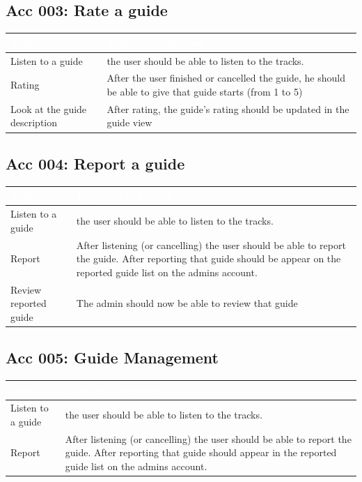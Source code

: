 \documentclass[12pt]{article}
\theoremstyle{definition}
\begin{document}
    \subsection{Acc 003: Rate a guide}
    \begin{tabular}{|p{.3\linewidth}|p{.7\linewidth}|}
        \hline
        \cellcolor[gray]{0.5}\textcolor{white}{Steps} & \cellcolor[gray]{0.5}\textcolor{white}{Expected behaviour} \\ \hline
        Listen to a guide & the user should be able to listen to the tracks. \\ \hline
        Rating & After the user finished or cancelled the guide, he should be able to give that guide starts (from 1 to 5) \\ \hline
        Look at the guide description & After rating, the guide's rating should be updated in the guide view \\ \hline
    \end{tabular}
    
    \subsection{Acc 004: Report a guide}
    \begin{tabular}{|p{.3\linewidth}|p{.7\linewidth}|}
        \hline
        \cellcolor[gray]{0.5}\textcolor{white}{Steps} & \cellcolor[gray]{0.5}\textcolor{white}{Expected behaviour} \\ \hline
        Listen to a guide & the user should be able to listen to the tracks. \\ \hline
        Report & After listening (or cancelling) the user should be able to report the guide. After reporting that guide should be appear on the reported guide list on the admins account. \\ \hline
        Review reported guide & The admin should now be able to review that guide \\ \hline
    \end{tabular}
    
    \subsection{Acc 005: Guide Management}
    \begin{tabular}{|p{.3\linewidth}|p{.7\linewidth}|}
        \hline
        \cellcolor[gray]{0.5}\textcolor{white}{Steps} & \cellcolor[gray]{0.5}\textcolor{white}{Expected behaviour} \\ \hline
        Listen to a guide & the user should be able to listen to the tracks. \\ \hline
        Report & After listening (or cancelling) the user should be able to report the guide. After reporting that guide should appear in the reported guide list on the admins account. \\ \hline
    \end{tabular}
    
\end{document}
